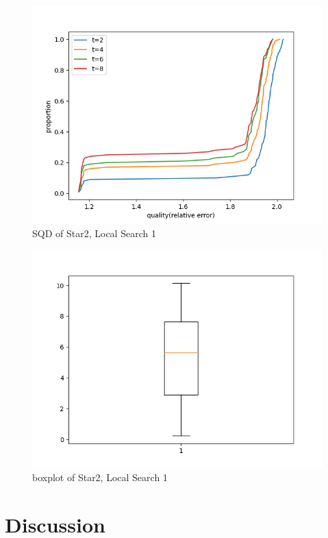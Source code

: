 \documentclass[acmlarge]{acmart}
\begin{document}
\begin{figure}[p]
	\includegraphics[width=\linewidth]{star2_SQD_LS1.png}
	\caption{SQD of Star2, Local Search 1}
\end{figure}

\begin{figure}[p]
	\includegraphics[width=\linewidth]{star2_boxplot_LS1.png}
	\caption{boxplot of Star2, Local Search 1}
\end{figure}



\section{Discussion}
\end{document}
